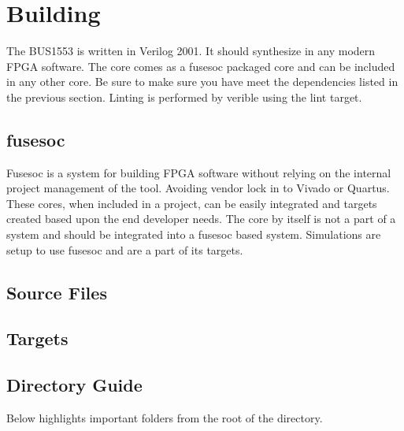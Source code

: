 \section{Building}

\par
The BUS1553 is written in Verilog 2001. It should synthesize in any modern FPGA software. The core comes as a fusesoc packaged core and can be included in any other core. Be sure to make sure you have meet the dependencies listed in the previous section. Linting is performed by verible using the lint target.

\subsection{fusesoc}
\par
Fusesoc is a system for building FPGA software without relying on the internal project management of the tool. Avoiding vendor lock in to Vivado or Quartus.
These cores, when included in a project, can be easily integrated and targets created based upon the end developer needs. The core by itself is not a part of
a system and should be integrated into a fusesoc based system. Simulations are setup to use fusesoc and are a part of its targets.

\subsection{Source Files}







\subsection{Targets}







\subsection{Directory Guide}

\par
Below highlights important folders from the root of the directory.

